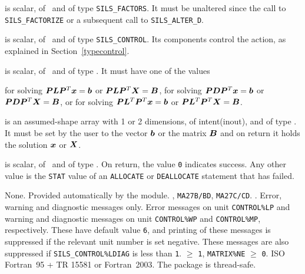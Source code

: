 \documentclass{galahad}
\newcommand{\packagename}{SILS}
\begin{document}
\begin{description} 
 is scalar, of \intentin\ and of type {\tt \packagename\_FACTORS}.
It must be unaltered since the call to {\tt \packagename\_FACTORIZE}  
or a subsequent call to {\tt \packagename\_ALTER\_D}. 
 
 is scalar, of \intentin\ and of type {\tt \packagename\_CONTROL}.
Its components control the action, as explained in Section~\ref{typecontrol}. 
 
 is scalar, of \intentin\, and of type \character. It 
must have one of the values 
\begin{description} 
 for solving ${\bm{P}} {\bm{L}} {\bm{P}}^T {\bm{x}} =  {\bm{b}}$ or 
                     ${\bm{P}} {\bm{L}} {\bm{P}}^T {\bm{X}} =  {\bm{B}}$,  
 for solving ${\bm{P}} {\bm{D}} {\bm{P}}^T {\bm{x}} =  {\bm{b}}$ or 
                  ${\bm{P}} {\bm{D}} {\bm{P}}^T {\bm{X}} =  {\bm{B}}$, or  
 for solving ${\bm{P}} {\bm{L}}^T {\bm{P}}^T {\bm{x}} =  {\bm{b}}$ or 
                  ${\bm{P}} {\bm{L}}^T {\bm{P}}^T {\bm{X}} = {\bm{B}}$.  
\end{description} 
 
 is an assumed-shape array with 1 or 2 dimensions, of 
intent(inout), and of type \realdp.  It must be set by the user to the 
vector ${\bm{b}}$ or the matrix ${\bm{B}}$ and on return it holds the solution 
${\bm{x}}$ or ${\bm{X}}$. 
 
 is scalar, of \intentout\, and of type \integer.  On return, 
the value {\tt 0} indicates success. Any other value is the {\tt STAT} value of 
an  {\tt ALLOCATE} or {\tt DEALLOCATE} statement that has failed. 
 
\end{description} 


\galgeneral

\galcommon None.
\galworkspace Provided automatically by the module.
, {\tt MA27B/BD}, {\tt MA27C/CD}.
.
\galio Error, warning and diagnostic messages only.  Error 
 messages on unit {\tt CONTROL\%LP} and warning and diagnostic messages on unit 
 {\tt CONTROL\%WP} and  {\tt CONTROL\%MP}, respectively.  These have default 
 value {\tt 6},  and printing of these messages 
 is suppressed if the relevant unit number is set negative.  These messages are
 also suppressed if {\tt \packagename\_CONTROL\%LDIAG} is less than {\tt 1}. 
 $\geq$ {\tt 1}, 
                 {\tt MATRIX\%NE} $\geq$ {\tt 0}. 
\galportability ISO Fortran~95 + TR 15581 or Fortran~2003. 
The package is thread-safe.
\end{document}
